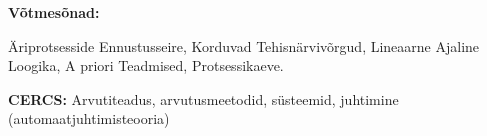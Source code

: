 \par
\vspace{4mm}
\noindent
\textbf{Võtmesõnad:} 
\par 
\noindent
Äriprotsesside Ennustusseire, Korduvad Tehisnärvivõrgud, Lineaarne Ajaline Loogika, A priori Teadmised, Protsessikaeve.


\vspace{4mm}
\par
\noindent
\textbf{CERCS:} Arvutiteadus, arvutusmeetodid, süsteemid, juhtimine (automaatjuhtimisteooria)





